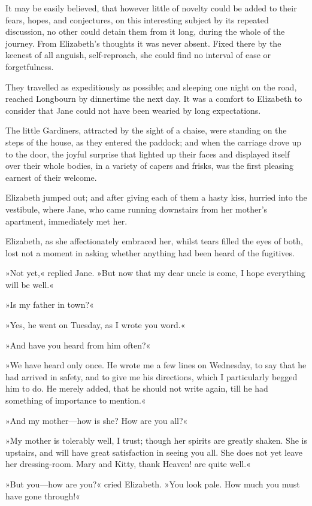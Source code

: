 It may be easily believed, that however little of novelty could be added to their fears, hopes, and conjectures, on this interesting subject by its repeated discussion, no other could detain them from it long, during the whole of the journey. From Elizabeth's thoughts it was never absent. Fixed there by the keenest of all anguish, self-reproach, she could find no interval of ease or forgetfulness.

They travelled as expeditiously as possible; and sleeping one night on the road, reached Longbourn by dinnertime the next day. It was a comfort to Elizabeth to consider that Jane could not have been wearied by long expectations.

The little Gardiners, attracted by the sight of a chaise, were standing on the steps of the house, as they entered the paddock; and when the carriage drove up to the door, the joyful surprise that lighted up their faces and displayed itself over their whole bodies, in a variety of capers and frisks, was the first pleasing earnest of their welcome.

Elizabeth jumped out; and after giving each of them a hasty kiss, hurried into the vestibule, where Jane, who came running downstairs from her mother's apartment, immediately met her.

Elizabeth, as she affectionately embraced her, whilst tears filled the eyes of both, lost not a moment in asking whether anything had been heard of the fugitives.

»Not yet,« replied Jane. »But now that my dear uncle is come, I hope everything will be well.«

»Is my father in town?«

»Yes, he went on Tuesday, as I wrote you word.«

»And have you heard from him often?«

»We have heard only once. He wrote me a few lines on Wednesday, to say that he had arrived in safety, and to give me his directions, which I particularly begged him to do. He merely added, that he should not write again, till he had something of importance to mention.«

»And my mother—how is she? How are you all?«

»My mother is tolerably well, I trust; though her spirits are greatly shaken. She is upstairs, and will have great satisfaction in seeing you all. She does not yet leave her dressing-room. Mary and Kitty, thank Heaven! are quite well.«

»But you—how are you?« cried Elizabeth. »You look pale. How much you must have gone through!«

